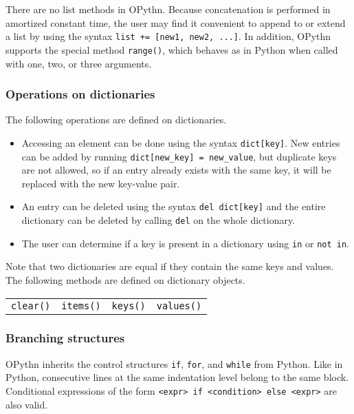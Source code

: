 \documentclass[11pt, twoside]{article}
\newcommand{\ms}{\texttt}
\begin{document}
    There are no list methods in OPythn. Because concatenation is performed in amortized constant time, the user may find it convenient to append to or extend a list by using the syntax \ms{list += [new1, new2, ...]}. In addition, OPythn supports the special method \ms{range()}, which behaves as in Python when called with one, two, or three arguments.

    \subsubsection{Operations on dictionaries}
    The following operations are defined on dictionaries.
    \begin{itemize}
        \item Accessing an element can be done using the syntax \ms{dict[key]}. New entries can be added by running \ms{dict[new\_key] = new\_value}, but duplicate keys are not allowed, so if an entry already exists with the same key, it will be replaced with the new key-value pair.
        \item An entry can be deleted using the syntax \ms{del dict[key]} and the entire dictionary can be deleted by calling \ms{del} on the whole dictionary.
        \item The user can determine if a key is present in a dictionary using \ms{in} or \ms{not in}.
    \end{itemize}
    Note that two dictionaries are equal if they contain the same keys and values. The following methods are defined on dictionary objects.
    \begin{center}
        \begin{tabular}{cccc}
            \ms{clear()} & \ms{items()} & \ms{keys()} & \ms{values()}\\
    \end{tabular}
    \end{center}

    \subsubsection{Branching structures}
    OPythn inherits the control structures \ms{if}, \ms{for}, and \ms{while} from Python. Like in Python, consecutive lines at the same indentation level belong to the same block. Conditional expressions of the form \ms{<expr> if <condition> else <expr>} are also valid.
\end{document}
